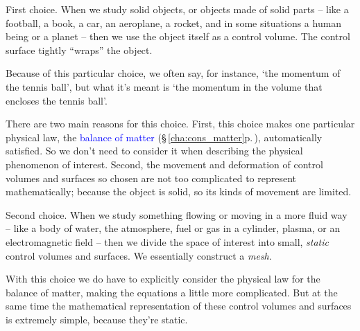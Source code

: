 \documentclass[a4paper,12pt,%
onecolumn,oneside,%
british%
]{memoir}
\renewcommand*{\|}[1][]{\nonscript\:#1\vert\nonscript\:\mathopen{}}
\newcommand*{\sect}{\S}%
\renewcommand*{\autoref}[3][\sect\,\ref]{\textcolor{blue}{#3} {\color{blue}\scriptsize(\faIcon[regular]{eye}\;#1{#2}\;p.\,\pageref{#2})}}
\begin{document}
\medskip

First choice. When we study solid objects, or objects made of solid parts -- like a football, a book, a car, an aeroplane, a rocket, and in some situations a human being or a planet -- then we use the object itself as a control volume. The control surface tightly \enquote{wraps} the object.

Because of this particular choice, we often say, for instance, \enquote*{the momentum of the tennis ball}, but what it's meant is \enquote*{the momentum in the volume that encloses the tennis ball}.

There are two main reasons for this choice. First, this choice makes one particular physical law, the \autoref{cha:cons_matter}{balance of matter}, automatically satisfied. So we don't need to consider it when describing the physical phenomenon of interest. Second, the movement and deformation of control volumes and surfaces so chosen are not too complicated to represent mathematically; because the object is solid, so its kinds of movement are limited.

\medskip

Second choice. When we study something flowing or moving in a more fluid way -- like a body of water, the atmosphere, fuel or gas in a cylinder, plasma, or an electromagnetic field -- then we divide the space of interest into small, \emph{static} control volumes and surfaces. We essentially construct a \emph{mesh}.

With this choice we do have to explicitly consider the physical law for the balance of matter, making the equations a little more complicated. But at the same time the mathematical representation of these control volumes and surfaces is extremely simple, because they're static.

\medskip
\end{document}
